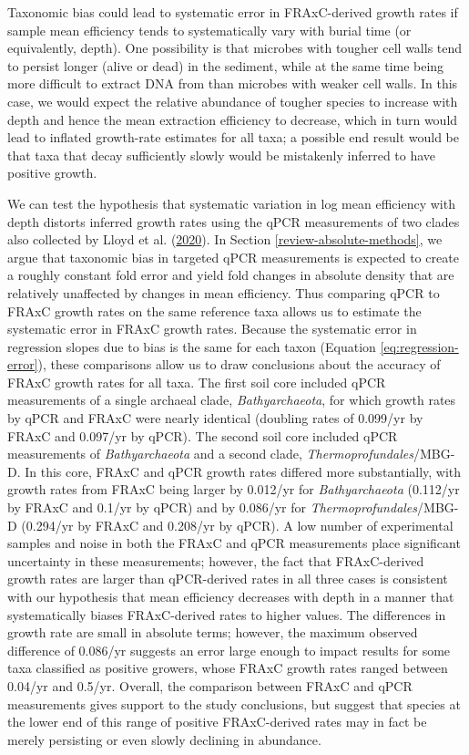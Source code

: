 \documentclass[
]{article}
\begin{document}
Taxonomic bias could lead to systematic error in FRAxC-derived growth rates if sample mean efficiency tends to systematically vary with burial time (or equivalently, depth).
One possibility is that microbes with tougher cell walls tend to persist longer (alive or dead) in the sediment, while at the same time being more difficult to extract DNA from than microbes with weaker cell walls.
In this case, we would expect the relative abundance of tougher species to increase with depth and hence the mean extraction efficiency to decrease, which in turn would lead to inflated growth-rate estimates for all taxa; a possible end result would be that taxa that decay sufficiently slowly would be mistakenly inferred to have positive growth.

We can test the hypothesis that systematic variation in log mean efficiency with depth distorts inferred growth rates using the qPCR measurements of two clades also collected by Lloyd et al. (\protect\hyperlink{ref-lloyd2020evid}{2020}).
In Section \ref{review-absolute-methods}, we argue that taxonomic bias in targeted qPCR measurements is expected to create a roughly constant fold error and yield fold changes in absolute density that are relatively unaffected by changes in mean efficiency.
Thus comparing qPCR to FRAxC growth rates on the same reference taxa allows us to estimate the systematic error in FRAxC growth rates.
Because the systematic error in regression slopes due to bias is the same for each taxon (Equation \eqref{eq:regression-error}), these comparisons allow us to draw conclusions about the accuracy of FRAxC growth rates for all taxa.
The first soil core included qPCR measurements of a single archaeal clade, \emph{Bathyarchaeota}, for which growth rates by qPCR and FRAxC were nearly identical (doubling rates of 0.099/yr by FRAxC and 0.097/yr by qPCR).
The second soil core included qPCR measurements of \emph{Bathyarchaeota} and a second clade, \emph{Thermoprofundales}/MBG-D.
In this core, FRAxC and qPCR growth rates differed more substantially, with growth rates from FRAxC being larger by 0.012/yr for \emph{Bathyarchaeota} (0.112/yr by FRAxC and 0.1/yr by qPCR) and by 0.086/yr for \emph{Thermoprofundales}/MBG-D (0.294/yr by FRAxC and 0.208/yr by qPCR).
A low number of experimental samples and noise in both the FRAxC and qPCR measurements place significant uncertainty in these measurements; however, the fact that FRAxC-derived growth rates are larger than qPCR-derived rates in all three cases is consistent with our hypothesis that mean efficiency decreases with depth in a manner that systematically biases FRAxC-derived rates to higher values.
The differences in growth rate are small in absolute terms; however, the maximum observed difference of 0.086/yr suggests an error large enough to impact results for some taxa classified as positive growers, whose FRAxC growth rates ranged between 0.04/yr and 0.5/yr.
Overall, the comparison between FRAxC and qPCR measurements gives support to the study conclusions, but suggest that species at the lower end of this range of positive FRAxC-derived rates may in fact be merely persisting or even slowly declining in abundance.
\end{document}

